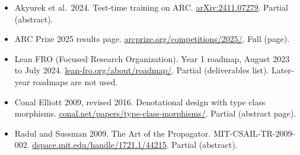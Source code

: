 \documentclass[10pt,letterpaper]{article}
\begin{document}
\begin{itemize}
  Chollet, Knoop, Kamradt and Landers 2024. ARC Prize 2024 Technical
  Report. \href{https://arxiv.org/abs/2412.04604}{arXiv:2412.04604}.
  Partial (abstract).
\item
  Akyurek et al.~2024. Test-time training on ARC.
  \href{https://arxiv.org/abs/2411.07279}{arXiv:2411.07279}. Partial
  (abstract).
\item
  ARC Prize 2025 results page.
  \href{https://arcprize.org/competitions/2025/}{arcprize.org/competitions/2025/}.
  Full (page).
\item
  Lean FRO (Focused Research Organization). Year 1 roadmap, August 2023
  to July 2024.
  \href{https://lean-fro.org/about/roadmap/}{lean-fro.org/about/roadmap/}.
  Partial (deliverables list). Later-year roadmaps are not used.
\item
  Conal Elliott 2009, revised 2016. Denotational design with type class
  morphisms.
  \href{https://conal.net/papers/type-class-morphisms/}{conal.net/papers/type-class-morphisms/}.
  Partial (abstract page).
\item
  Radul and Sussman 2009. The Art of the Propagator.
  MIT-CSAIL-TR-2009-002.
  \href{https://dspace.mit.edu/handle/1721.1/44215}{dspace.mit.edu/handle/1721.1/44215}.
  Partial (abstract).
\end{itemize}
\end{document}
